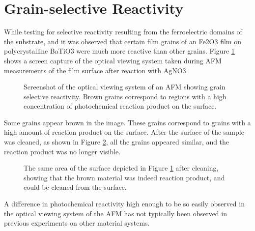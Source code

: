 \documentclass[12pt,%
              twoside,
               letterpaper]{uiothesis}
\begin{document}
\section{Grain-selective Reactivity}
\label{subsec:ch6grain}


While testing for selective reactivity resulting from the ferroelectric domains of the substrate, and it was observed that certain film grains of an Fe2O3 film on polycrystalline BaTiO3 were much more reactive than other grains. Figure \ref{fig:btoreacted} shows a screen capture of the optical viewing system taken during AFM measurements of the film surface after reaction with AgNO3.
\begin{figure}[htbp]
\begin{center}
\caption[Optical image showing grain selective reactivity]{Screenshot of the optical viewing system of an AFM showing grain selective reactivity. Brown grains correspond to regions with a high concentration of photochemical reaction product on the surface.}
\label{fig:btoreacted} %
\end{center}
\end{figure}
Some grains appear brown in the image. These grains correspond to grains with a high amount of reaction product on the surface. After the surface of the sample was cleaned, as shown in Figure \ref{fig:btoclean}, all the grains appeared similar, and the reaction product was no longer visible.
\begin{figure}[htbp]
\begin{center}
\caption[Area of the surface depicted in Figure \ref{fig:btoreacted} after cleaning]{The same area of the surface depicted in Figure \ref{fig:btoreacted} after cleaning, showing that the brown material was indeed reaction product, and could be cleaned from the surface.}
\label{fig:btoclean} %
\end{center}
\end{figure}
A difference in photochemical reactivity high enough to be so easily observed in the optical viewing system of the AFM has not typically been observed in previous experiments on other material systems.
\end{document}
